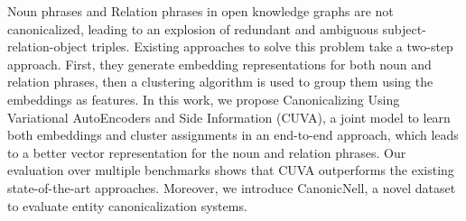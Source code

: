 Noun phrases and Relation phrases in open knowledge graphs are not canonicalized, leading to an explosion of redundant and ambiguous subject-relation-object triples. Existing approaches to solve this problem take a two-step approach. First, they generate embedding representations for both noun and relation phrases, then a clustering algorithm is used to group them using the embeddings as features. In this work, we propose Canonicalizing Using Variational AutoEncoders and Side Information (CUVA), a joint model to learn both embeddings and cluster assignments in an end-to-end approach, which leads to a better vector representation for the noun and relation phrases. Our evaluation over multiple benchmarks shows that CUVA outperforms the existing state-of-the-art approaches. Moreover, we introduce CanonicNell, a novel dataset to evaluate entity canonicalization systems.
